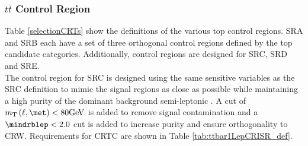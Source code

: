 

\subsubsection{\boldmath$t\bar{t}$ Control Region}

Table \ref{selectionCRTs} show the definitions of the various top control regions. SRA and SRB each have a set of three orthogonal control regions defined by the top candidate categories. Additionally, control regions are designed for SRC, SRD and SRE.  \\ %

The control region for SRC is designed using the same sensitive variables as the SRC definition to mimic the signal regions as close as possible while maintaining a high purity of the dominant background semi-leptonic \ttbar.  A cut of $\mtlepmet < 80\gev$ is added to remove signal contamination and a $\mindrblep<2.0$ cut is added to increase purity and ensure orthogonality to CRW. Requirements for CRTC are shown in Table \ref{tab:ttbar1LepCRISR_def}. \\


